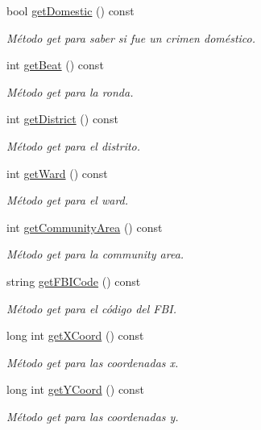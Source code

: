 \begin{DoxyCompactItemize}
bool \hyperlink{classcrimen_a1849e7a82111773a6919318b9cf1d05d}{get\-Domestic} () const 
\begin{DoxyCompactList}\small\item\em Método get para saber si fue un crimen doméstico. \end{DoxyCompactList}\item 
int \hyperlink{classcrimen_a2938f6b598552819264dedec56d19a73}{get\-Beat} () const 
\begin{DoxyCompactList}\small\item\em Método get para la ronda. \end{DoxyCompactList}\item 
int \hyperlink{classcrimen_a54fa473a08bc73704bfb0e5c62ca28ca}{get\-District} () const 
\begin{DoxyCompactList}\small\item\em Método get para el distrito. \end{DoxyCompactList}\item 
int \hyperlink{classcrimen_ae618d6002c73d130dae72fab4be0066f}{get\-Ward} () const 
\begin{DoxyCompactList}\small\item\em Método get para el ward. \end{DoxyCompactList}\item 
int \hyperlink{classcrimen_a4dd787f30527c646c1a80eb006e3c576}{get\-Community\-Area} () const 
\begin{DoxyCompactList}\small\item\em Método get para la community area. \end{DoxyCompactList}\item 
string \hyperlink{classcrimen_aa16d26a4af5cc473a13f6c0e7121577f}{get\-F\-B\-I\-Code} () const 
\begin{DoxyCompactList}\small\item\em Método get para el código del F\-B\-I. \end{DoxyCompactList}\item 
long int \hyperlink{classcrimen_a5a91673c04f22d9b38b2368f66576ec5}{get\-X\-Coord} () const 
\begin{DoxyCompactList}\small\item\em Método get para las coordenadas x. \end{DoxyCompactList}\item 
long int \hyperlink{classcrimen_a8ebf0d731cdef3f62495f9bfe7ec8c93}{get\-Y\-Coord} () const 
\begin{DoxyCompactList}\small\item\em Método get para las coordenadas y. \end{DoxyCompactList}\item 

\end{DoxyCompactItemize}
